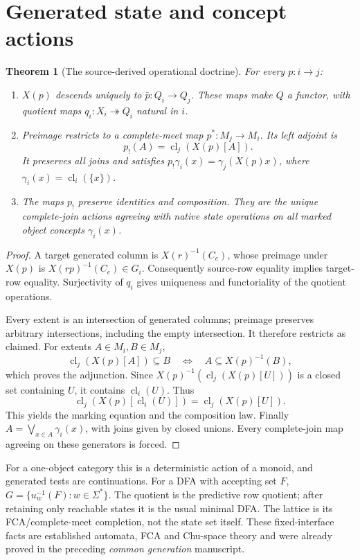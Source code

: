\documentclass[11pt]{article}
\newtheorem{theorem}{Theorem}[section]
\theoremstyle{remark}\newtheorem{remark}[theorem]{Remark}
\newcommand{\cl}{\operatorname{cl}}
\begin{document}
\section{Generated state and concept actions}
\begin{theorem}[The source-derived operational doctrine]
For every $p:i\to j$:
\begin{enumerate}
\item $X(p)$ descends uniquely to $\bar p:Q_i\to Q_j$. These maps
make $Q$ a functor, with quotient maps $q_i:X_i\twoheadrightarrow Q_i$
natural in $i$.
\item Preimage restricts to a complete-meet map
$p^*:M_j\to M_i$. Its left adjoint is
\[
 p_!(A)=\cl_j(X(p)[A]).
\]
It preserves all joins and satisfies
$p_!\gamma_i(x)=\gamma_j(X(p)x)$, where
$\gamma_i(x)=\cl_i(\{x\})$.
\item The maps $p_!$ preserve identities and composition. They are the
unique complete-join actions agreeing with native state operations on
all marked object concepts $\gamma_i(x)$.
\end{enumerate}
\end{theorem}
\begin{proof}
A target generated column is $X(r)^{-1}(C_e)$, whose preimage under
$X(p)$ is $X(rp)^{-1}(C_e)\in G_i$. Consequently source-row equality
implies target-row equality. Surjectivity of $q_i$ gives uniqueness and
functoriality of the quotient operations.

Every extent is an intersection of generated columns; preimage preserves
arbitrary intersections, including the empty intersection. It therefore
restricts as claimed. For extents $A\in M_i,B\in M_j$,
\[
 \cl_j(X(p)[A])\subseteq B
 \quad\Longleftrightarrow\quad
 A\subseteq X(p)^{-1}(B),
\]
which proves the adjunction. Since $X(p)^{-1}(\cl_j(X(p)[U]))$ is a
closed set containing $U$, it contains $\cl_i(U)$. Thus
\begin{equation}
 \cl_j(X(p)[\cl_i(U)])=\cl_j(X(p)[U]).\tag{CN}
\end{equation}
This yields the marking equation and the composition law.
Finally $A=\bigvee_{x\in A}\gamma_i(x)$, with joins given by closed
unions. Every complete-join map agreeing on these generators is forced.
\end{proof}

For a one-object category this is a deterministic action of a monoid,
and generated tests are continuations. For a DFA with accepting set $F$,
$G=\{u_w^{-1}(F):w\in\Sigma^*\}$. The quotient is the predictive
row quotient; after retaining only reachable states it is the usual
minimal DFA. The lattice is its FCA/complete-meet completion, not the
state set itself. These fixed-interface facts are established automata,
FCA and Chu-space theory and were already proved in the preceding
\emph{common generation} manuscript.
\end{document}
